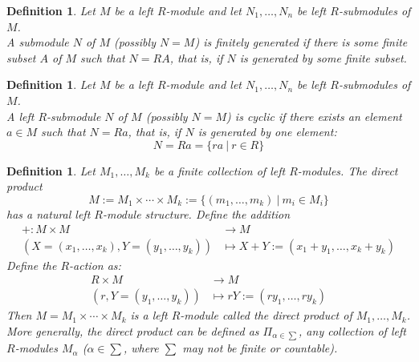 \documentclass[a4paper,8pt]{article}
\newcommand{\hlt}[1]{\textit{{\color{blue}#1}}}
\theoremstyle{theorem}
\newtheorem{definition}[theorem]{Definition}
\begin{document}
\begin{definition}
Let $M$ be a left $R$-module and let $N_1, \ldots, N_n$ be left $R$-submodules of $M$.\\
A submodule $N$ of $M$ (possibly $N=M$) is \hlt{finitely generated} if there is some finite subset $A$ of $M$ such that $N=RA$, that is, if $N$ is generated by some finite subset.
\end{definition}

\begin{definition}
Let $M$ be a left $R$-module and let $N_1, \ldots, N_n$ be left $R$-submodules of $M$.\\
A left $R$-submodule $N$ of $M$ (possibly $N=M$) is \hlt{cyclic} if there exists an element $a \in M$ such that $N = Ra$, that is, if $N$ is generated by one element:
\begin{equation}
N = Ra = \{ra \ | \ r \in R\} \nonumber
\end{equation}
\end{definition}

\begin{definition}
\label{def:directprod}
Let $M_1, \ldots, M_k$ be a finite collection of left $R$-modules. The direct product
\begin{equation}
M := M_1 \times \cdots \times M_k := \{(m_1, \ldots, m_k) \ | \ m_i \in M_i\} \nonumber
\end{equation}	
has a natural left $R$-module structure. Define the addition
\begin{align}
+ : M \times M &\rightarrow M \nonumber \\
(X = (x_1, \ldots, x_k), Y = (y_1, \ldots, y_k)) &\mapsto X + Y := (x_1 + y_1, \ldots, x_k + y_k) \nonumber
\end{align}
Define the $R$-action as:
\begin{align}
R \times M &\rightarrow M \nonumber \\
(r, Y=(y_1, \ldots, y_k)) &\mapsto rY := (ry_1, \ldots, ry_k) \nonumber
\end{align}
Then $M = M_1 \times \cdots \times M_k$ is a left $R$-module called the \hlt{direct product} of $M_1, \ldots, M_k$. \\
More generally, the direct product can be defined as $\Pi_{\alpha \in \sum}$, any collection of left $R$-modules $M_{\alpha}$ ($\alpha \in \sum$, where $\sum$ may not be finite or countable).
\end{definition}
\end{document}
